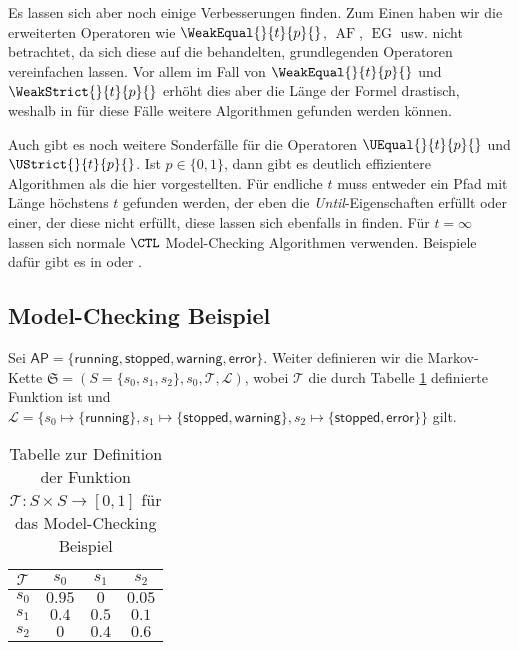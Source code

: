 Es lassen sich aber noch einige Verbesserungen finden. 
Zum Einen haben wir die erweiterten Operatoren wie $\WeakEqual{}{t}{p}{}$, $\operatorname{AF}$, $\operatorname{EG}$ usw. nicht betrachtet, da sich diese auf die behandelten, grundlegenden Operatoren vereinfachen lassen. 
Vor allem im Fall von $\WeakEqual{}{t}{p}{}$ und $\WeakStrict{}{t}{p}{}$ erhöht dies aber die Länge der Formel drastisch, weshalb in \cite{hansson1994logic} für diese Fälle weitere Algorithmen gefunden werden können.

Auch gibt es noch weitere Sonderfälle für die Operatoren $\UEqual{}{t}{p}{}$ und $\UStrict{}{t}{p}{}$. Ist $p\in \{0,1\}$, dann gibt es deutlich effizientere Algorithmen als die hier vorgestellten. Für endliche $t$ muss entweder ein Pfad mit Länge höchstens $t$ gefunden werden, der eben die \textit{Until}-Eigenschaften erfüllt oder einer, der diese nicht erfüllt, diese lassen sich ebenfalls in \cite{hansson1994logic} finden. Für $t=\infty$ lassen sich normale $\CTL$ Model-Checking Algorithmen verwenden. Beispiele dafür gibt es in \cite{baier2008principles} oder \cite{clarke1982design}.

\subsection{Model-Checking Beispiel}

Sei $\mathsf{AP}=\{\mathsf{running}, \mathsf{stopped}, \mathsf{warning}, \mathsf{error}\}$. Weiter definieren wir die Markov-Kette $\mathfrak{S}=(S=\{s_0,s_1,s_2\}, s_0, \mathcal{T}, \mathcal{L})$, wobei $\mathcal{T}$ die durch Tabelle \ref{MarkovT2} definierte Funktion ist und $\mathcal{L}=\{s_0\mapsto\{\mathsf{running}\}, s_1\mapsto \{\mathsf{stopped}, \mathsf{warning}\}, s_2\mapsto \{\mathsf{stopped}, \mathsf{error}\}\}$ gilt.

\begin{table}[h]
	\begin{center}
		\begin{tabular}{c|ccc}
			$\mathcal{T}$ & $s_0$ & $s_1$ & $s_2$ \\
			\hline
			$s_0$ & $0.95$  & $0$ & $0.05$ \\
			$s_1$ & $0.4$ & $0.5$   & $0.1$ \\
			$s_2$ & $0$  & $0.4$  & $0.6$   \\
		\end{tabular}
		\caption{Tabelle zur Definition der Funktion $\mathcal{T}:S\times S\to [0,1]$ für das Model-Checking Beispiel}
		\label{MarkovT2}
	\end{center}
\end{table}


